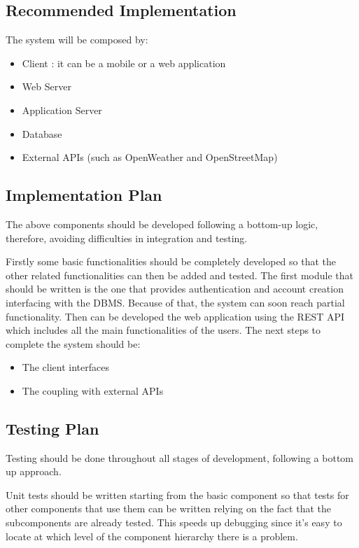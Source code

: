 \subsection{Recommended Implementation}
The system will be composed by:
\begin{itemize}
    \item Client : it can be a mobile or a web application
    \item Web Server
    \item Application Server
    \item Database
    \item External APIs (such as OpenWeather and OpenStreetMap)
\end{itemize}

\subsection{Implementation Plan}
The above components should be developed following a bottom-up logic, therefore, avoiding difficulties in integration and testing.\bigskip

Firstly some basic functionalities should be completely developed so that the other related functionalities can then be added and tested.\newline
The first module that should be written is the one that provides authentication and account creation interfacing with the DBMS. 
Because of that, the system can soon reach partial functionality.\newline 
Then can be developed the web application using the REST API which includes all the main functionalities of the users.
The next steps to complete the system should be:
\begin{itemize}
    \item The client interfaces
    \item The coupling with external APIs
\end{itemize}

\subsection{Testing Plan}
Testing should be done throughout all stages of development, following a bottom up approach.\bigskip

Unit tests should be written starting from the basic component so that tests for other components that
use them can be written relying on the fact that the subcomponents are already tested. This speeds up
debugging since it’s easy to locate at which level of the component hierarchy there is a problem.

